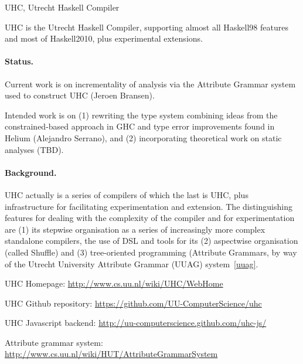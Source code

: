 \begin{hcarentry}{UHC, Utrecht Haskell Compiler}
\label{uhc}
\label{ehc}
\makeheader


UHC is the Utrecht Haskell Compiler, supporting almost all Haskell98 features and most of Haskell2010, plus
experimental extensions.

\paragraph{Status.}

Current work is on
incrementality of analysis via the Attribute Grammar system used to construct UHC (Jeroen Bransen).

Intended work is on (1) rewriting the type system combining ideas from
the constrained-based approach in GHC and type error improvements found in Helium (Alejandro Serrano),
and (2) incorporating theoretical work on static analyses (TBD).

\paragraph{Background.}

UHC actually is a series of compilers of which the last is UHC, plus
infrastructure for facilitating experimentation and extension.
The distinguishing features for dealing with the complexity of the compiler and for experimentation are
(1) its stepwise organisation as a series of increasingly more complex standalone compilers,
the use of DSL and tools for its (2) aspectwise organisation (called Shuffle) and
(3) tree-oriented programming (Attribute Grammars, by way of the
Utrecht University Attribute Grammar (UUAG) system~\cref{uuag}.

\FurtherReading
\begin{compactitem}
\item UHC Homepage:
\url{http://www.cs.uu.nl/wiki/UHC/WebHome}

\item UHC Github repository:
\url{https://github.com/UU-ComputerScience/uhc}

\item UHC Javascript backend:
\url{http://uu-computerscience.github.com/uhc-js/}

\item Attribute grammar system:
\url{http://www.cs.uu.nl/wiki/HUT/AttributeGrammarSystem}

\end{compactitem}
\end{hcarentry}
